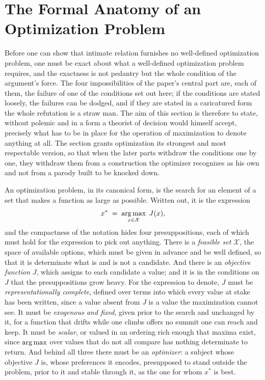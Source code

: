 \section{The Formal Anatomy of an Optimization Problem}
\label{p25:sec:anatomy}

\noindent
Before one can show that intimate relation furnishes no well-defined optimization problem, one must be exact about what a well-defined optimization problem requires, and the exactness is not pedantry but the whole condition of the argument's force. The four impossibilities of the paper's central part are, each of them, the failure of one of the conditions set out here; if the conditions are stated loosely, the failures can be dodged, and if they are stated in a caricatured form the whole refutation is a straw man. The aim of this section is therefore to state, without polemic and in a form a theorist of decision would himself accept, precisely what has to be in place for the operation of maximization to denote anything at all. The section grants optimization its strongest and most respectable version, so that when the later parts withdraw the conditions one by one, they withdraw them from a construction the optimizer recognizes as his own and not from a parody built to be knocked down.

An optimization problem, in its canonical form, is the search for an element of a set that makes a function as large as possible. Written out, it is the expression
\[
x^{\ast} \;=\; \operatorname*{arg\,max}_{x \in \mathcal{X}} \; J(x),
\]
and the compactness of the notation hides four presuppositions, each of which must hold for the expression to pick out anything. There is a \emph{feasible set} $\mathcal{X}$, the space of available options, which must be given in advance and be well defined, so that it is determinate what is and is not a candidate. And there is an \emph{objective function} $J$, which assigns to each candidate a value; and it is in the conditions on $J$ that the presuppositions grow heavy. For the expression to denote, $J$ must be \emph{representationally complete}, defined over terms into which every value at stake has been written, since a value absent from $J$ is a value the maximization cannot see. It must be \emph{exogenous and fixed}, given prior to the search and unchanged by it, for a function that drifts while one climbs offers no summit one can reach and keep. It must be \emph{scalar}, or valued in an ordering rich enough that maxima exist, since $\operatorname*{arg\,max}$ over values that do not all compare has nothing determinate to return. And behind all three there must be an \emph{optimizer}: a subject whose objective $J$ is, whose preferences it encodes, presupposed to stand outside the problem, prior to it and stable through it, as the one for whom $x^{\ast}$ is best.


